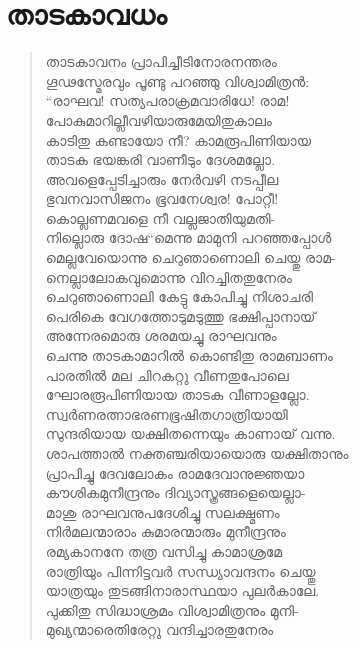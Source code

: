 
\section{താടകാവധം}

\begin{verse}
താടകാവനം പ്രാപിച്ചീടിനോരനന്തരം\\
ഗൂഢസ്മേരവും പൂണ്ടു പറഞ്ഞു വിശ്വാമിത്രന്‍:\\
“രാഘവ! സത്യപരാക്രമവാരിധേ! രാമ!\\
പോകുമാറില്ലീവഴിയാരുമേയിതുകാലം\\
കാടിതു കണ്ടായോ നീ? കാമരൂപിണിയായ\\
താടക ഭയങ്കരി വാണീടും ദേശമല്ലോ.\\
അവളെപ്പേടിച്ചാരും നേര്‍വഴി നടപ്പീല\\
ഭുവനവാസിജനം ഭൂവനേശ്വര! പോറ്റീ!\\
കൊല്ലണമവളെ നീ വല്ലജാതിയുമതി-\\
നില്ലൊരു ദോഷ“മെന്നു മാമുനി പറഞ്ഞപ്പോള്‍\\
മെല്ലവേയൊന്നു ചെറുഞാണൊലി ചെയ്തു രാമ-\\
നെല്ലാലോകവുമൊന്നു വിറച്ചിതതുനേരം\\
ചെറുഞാണൊലി കേട്ടു കോപിച്ചു നിശാചരി\\
പെരികെ വേഗത്തോടുമടുത്തു ഭക്ഷിപ്പാനായ്\\
അന്നേരമൊരു ശരമയച്ചു രാഘവനും\\
ചെന്നു താടകാമാറില്‍ കൊണ്ടിതു രാമബാണം\\
പാരതില്‍ മല ചിറകറ്റു വീണതുപോലെ\\
ഘോരരൂപിണിയായ താടക വീണാളല്ലോ.\\
സ്വര്‍ണരത്നാഭരണഭൂഷിതഗാത്രിയായി\\
സുന്ദരിയായ യക്ഷിതന്നെയും കാണായ് വന്നു.\\
ശാപത്താല്‍ നക്തഞ്ചരിയായൊരു യക്ഷിതാനും\\
പ്രാപിച്ചു ദേവലോകം രാമദേവാനുജ്ഞയാ\\
കൗശികമുനീന്ദ്രനും ദിവ്യാസ്ത്രങ്ങളെയെല്ലാ-\\
മാശു രാഘവനുപദേശിച്ചു സലക്ഷ്മണം\\
നിര്‍മലന്മാരാം കുമാരന്മാരും മുനീന്ദ്രനും\\
രമ്യകാനനേ തത്ര വസിച്ചു കാമാശ്രമേ\\
രാത്രിയും പിന്നിട്ടവര്‍ സന്ധ്യാവന്ദനം ചെയ്തു\\
യാത്രയും തുടങ്ങിനാരാസ്ഥയാ പുലര്‍കാലേ.\\
പുക്കിതു സിദ്ധാശ്രമം വിശ്വാമിത്രനും മുനി-\\
മുഖ്യന്മാരെതിരേറ്റു വന്ദിച്ചാരതുനേരം\\

\end{verse}
